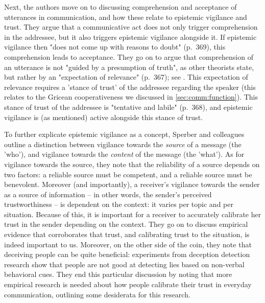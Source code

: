 Next, the authors move on to discussing comprehension and acceptance of utterances in communication, and how these relate to epistemic vigilance and trust.
They argue that a communicative act does not only trigger comprehension in the addressee, but it also triggers epistemic vigilance alongside it. If epistemic vigilance then "does not come up with reasons to doubt" (p.~369), this comprehension leads to acceptance.
They go on to argue that comprehension of an utterance is not "guided by a presumption of truth", as other theorists state, but rather by an "expectation of relevance" (p.~367); see \citet{SperberWilson86}. This expectation of relevance requires a 'stance of trust' of the addressee regarding the speaker (this relates to the Gricean cooperativeness we discussed in \cref{sec:comm:function}).
This stance of trust of the addressee is "tentative and labile" (p.~368), and epistemic vigilance is (as mentioned) active alongside this stance of trust.


To further explicate epistemic vigilance as a concept, Sperber and colleagues outline a distinction between vigilance towards the \emph{source} of a message (the 'who'), and vigilance towards the \emph{content} of the message (the 'what').
As for vigilance towards the source, they note that the reliability of a source depends on two factors: a reliable source must be competent, and a reliable source must be benevolent.
Moreover (and importantly), a receiver's vigilance towards the sender as a source of information -- in other words, the sender's perceived trustworthiness -- is dependent on the context: it varies per topic and per situation.
Because of this, it is important for a receiver to accurately calibrate her trust in the sender depending on the context.
They go on to discuss empirical evidence that corroborates that trust, and calibrating trust to the situation, is indeed important to us.
Moreover, on the other side of the coin, they note that deceiving people can be quite beneficial: experiments from deception detection research show that people are not good at detecting lies based on non-verbal behavioral cues.
They end this particular discussion by noting that more empirical research is needed about how people calibrate their trust in everyday communication, outlining some desiderata for this research.

